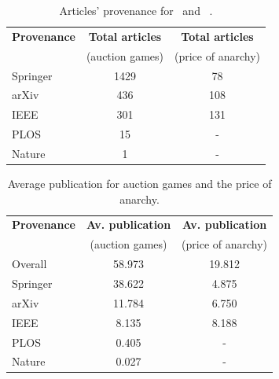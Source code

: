\documentclass{article}
\begin{document}
\begin{table}[!hbtp]
    \begin{center}
    \begin{tabular}{lcc}
        \toprule
        \textbf{Provenance} & \textbf{Total articles} & \textbf{Total articles}\\
                   & (auction games) & (price of anarchy)\\
        \midrule
        Springer   &                1429 &                78 \\
        arXiv      &                 436 &                108 \\
        IEEE       &                 301 &                131 \\
        PLOS       &                  15 &                 -  \\
        Nature     &                   1 &                 -   \\
        \bottomrule
    \end{tabular}
    \end{center}
    \caption{Articles' provenance for~\cite{} and ~\cite{}.}
    \label{table:provenance_other_topics}
\end{table}

\begin{table}[!hbtp]
    \begin{center}
    \begin{tabular}{lcc}
        \toprule
        \textbf{Provenance} & \textbf{Av. publication}  & \textbf{Av. publication}\\
                            & (auction games) & (price of anarchy)\\
        \midrule
        Overall             &          58.973 & 19.812 \\
        Springer            &          38.622 & 4.875  \\
        arXiv               &          11.784 & 6.750   \\
        IEEE                &           8.135 & 8.188    \\
        PLOS                &           0.405 &   -       \\
        Nature              &           0.027 &   -        \\
        \bottomrule
    \end{tabular}
    \end{center}
    \caption{Average publication for auction games and the price of anarchy.}
    \label{table:other_topics_publication_rates}
\end{table}
\end{document}
